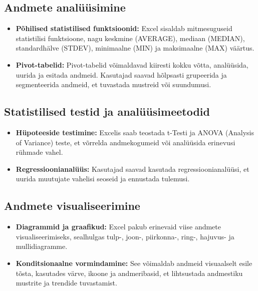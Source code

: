 \documentclass[
]{book}
\providecommand{\tightlist}{%
  \setlength{\itemsep}{0pt}\setlength{\parskip}{0pt}}
\begin{document}
\subsection{Andmete analüüsimine}\label{andmete-analuxfcuxfcsimine}

\begin{itemize}
\tightlist
\item
  \textbf{Põhilised statistilised funktsioonid:} Excel sisaldab mitmesuguseid statistilisi funktsioone, nagu keskmine (AVERAGE), mediaan (MEDIAN), standardhälve (STDEV), minimaalne (MIN) ja maksimaalne (MAX) väärtus.
\item
  \textbf{Pivot-tabelid:} Pivot-tabelid võimaldavad kiiresti kokku võtta, analüüsida, uurida ja esitada andmeid. Kasutajad saavad hõlpsasti grupeerida ja segmenteerida andmeid, et tuvastada mustreid või suundumusi.
\end{itemize}

\subsection{Statistilised testid ja analüüsimeetodid}\label{statistilised-testid-ja-analuxfcuxfcsimeetodid}

\begin{itemize}
\tightlist
\item
  \textbf{Hüpoteeside testimine:} Excelis saab teostada t-Testi ja ANOVA (Analysis of Variance) teste, et võrrelda andmekogumeid või analüüsida erinevusi rühmade vahel.
\item
  \textbf{Regressioonianalüüs:} Kasutajad saavad kasutada regressioonianalüüsi, et uurida muutujate vahelisi seoseid ja ennustada tulemusi.
\end{itemize}

\subsection{Andmete visualiseerimine}\label{andmete-visualiseerimine-1}

\begin{itemize}
\tightlist
\item
  \textbf{Diagrammid ja graafikud:} Excel pakub erinevaid viise andmete visualiseerimiseks, sealhulgas tulp-, joon-, piirkonna-, ring-, hajuvus- ja mullidiagramme.
\item
  \textbf{Konditsionaalne vormindamine:} See võimaldab andmeid visuaalselt esile tõsta, kasutades värve, ikoone ja andmeribasid, et lihtsustada andmestiku mustrite ja trendide tuvastamist.
\end{itemize}
\end{document}

